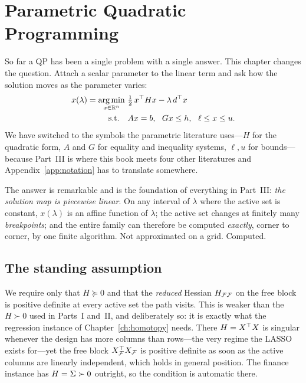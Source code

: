 \chapter{Parametric Quadratic Programming}
\label{ch:parametric}

So far a QP has been a single problem with a single answer. This chapter changes
the question. Attach a scalar parameter to the linear term and ask how the solution
moves as the parameter varies:
\begin{equation}
\label{eq:pqp}
\begin{aligned}
x(\lambda) = \operatorname*{arg\,min}_{x \in \mathbb{R}^n}\ &\tfrac12\, x^{\top} H x - \lambda\, d^{\top} x \\
\text{s.t.}\quad &A x = b,\ \ G x \le h,\ \ \ell \le x \le u .
\end{aligned}
\end{equation}
We have switched to the symbols the parametric literature uses---$H$ for the
quadratic form, $A$ and $G$ for equality and inequality systems, $\ell,u$ for
bounds---because Part~III is where this book meets four other literatures and
Appendix~\ref{app:notation} has to translate somewhere.

The answer is remarkable and is the foundation of everything in Part~III:
\emph{the solution map is piecewise linear}. On any interval of $\lambda$ where the
active set is constant, $x(\lambda)$ is an affine function of $\lambda$; the active
set changes at finitely many \emph{breakpoints}; and the entire family can therefore
be computed \emph{exactly}, corner to corner, by one finite algorithm. Not
approximated on a grid. Computed.

\section{The standing assumption}

We require only that $H \succeq 0$ and that the \emph{reduced} Hessian
$H_{\mathcal{F}\mathcal{F}}$ on the free block is positive definite at every active set the path
visits. This is weaker than the $H \succ 0$ used in Parts~I and~II, and deliberately
so: it is exactly what the regression instance of Chapter~\ref{ch:homotopy} needs.
There $H = X^{\top} X$ is singular whenever the design has more columns than rows---the
very regime the LASSO exists for---yet the free block $X_{\mathcal{F}}^{\top} X_{\mathcal{F}}$ is positive
definite as soon as the active columns are linearly independent, which holds in
general position. The finance instance has $H = \Sigma \succ 0$ outright, so the
condition is automatic there.

